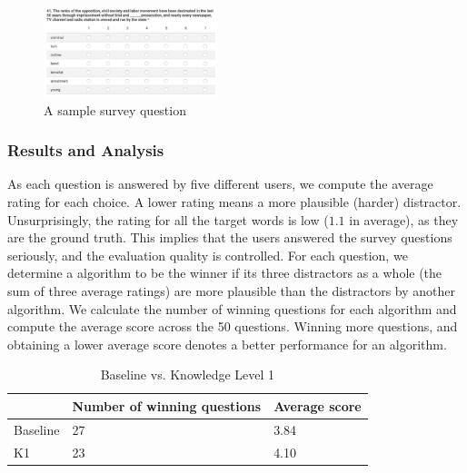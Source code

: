 \begin{figure}[ht]
   \centering
   \includegraphics[width=0.45\textwidth]{distractor_1.jpg}
   \caption{A sample survey question}
   \label{fig:distractor_1}
\end{figure}

\subsubsection{Results and Analysis}
As each question is answered by five different users, we compute the average rating for each choice. A lower rating means a more plausible (harder) distractor. 
Unsurprisingly, the rating for all the target words is low ($1.1$ in average), as they are the ground truth. This implies that the users answered the survey questions seriously, and the evaluation quality is controlled. For each question, we determine a  algorithm to be the winner if its three distractors as a whole (the sum of three average ratings) are more plausible than the distractors by another algorithm. We calculate the number of winning questions for each algorithm and compute the average score across the 50 questions.  Winning more questions, and obtaining a lower average score denotes a better performance for an algorithm.




\begin{table}[th]
    \caption{ Baseline vs. Knowledge Level 1}
    \label{table:distractor_1}
    \begin{center}
    \begin{tabular}{| p{1.5cm} | p{2.5cm} | p{2.2cm} |}
        \hline
         & Number of winning questions & Average score\\
        \hline
        Baseline & 27 & 3.84\\
        \hline
        K1 & 23 & 4.10\\
        \hline
    \end{tabular}
    \end{center}
\end{table}

